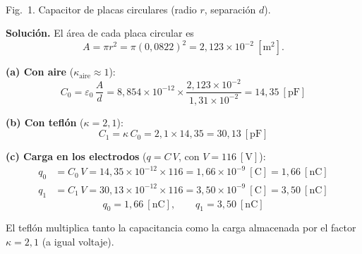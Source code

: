 \documentclass[12pt,letterpaper]{article}
\begin{document}
\begin{center}
\\[2pt]
{\footnotesize Fig.\ 1. Capacitor de placas circulares (radio $r$, separaci\'on $d$).}
\end{center}

\medskip
\noindent\textbf{Soluci\'on.}
El \'area de cada placa circular es
\[
    A = \pi r^2 = \pi (0{,}0822)^2 = 2{,}123\times10^{-2}\ [\text{m}^2].
\]

\noindent\textbf{(a) Con aire} ($\kappa_{\text{aire}}\approx 1$):
\[
    \boxed{C_0 = \varepsilon_0\,\frac{A}{d}
        = 8{,}854\times10^{-12}\times\frac{2{,}123\times10^{-2}}{1{,}31\times10^{-2}}
        = 14{,}35\ [\text{pF}]}
\]

\noindent\textbf{(b) Con tefl\'on} ($\kappa = 2{,}1$):
\[
    \boxed{C_1 = \kappa\,C_0 = 2{,}1\times 14{,}35 = 30{,}13\ [\text{pF}]}
\]

\noindent\textbf{(c) Carga en los electrodos} ($q = C\,V$, con $V = 116\ [\text{V}]$):
\begin{align*}
    q_0 &= C_0\,V = 14{,}35\times10^{-12}\times 116 = 1{,}66\times10^{-9}\ [\text{C}] = 1{,}66\ [\text{nC}]\\[2pt]
    q_1 &= C_1\,V = 30{,}13\times10^{-12}\times 116 = 3{,}50\times10^{-9}\ [\text{C}] = 3{,}50\ [\text{nC}]
\end{align*}
\[
    \boxed{q_0 = 1{,}66\ [\text{nC}],\qquad q_1 = 3{,}50\ [\text{nC}]}
\]

\noindent El tefl\'on multiplica tanto la capacitancia como la carga almacenada por el factor
$\kappa = 2{,}1$ (a igual voltaje).

\newpage

\end{document}
